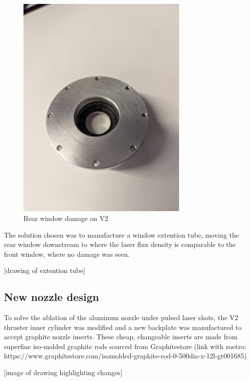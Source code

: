             \begin{figure}
                \centering
                \includegraphics[width=0.75\textwidth]{assets/4 experiments/window damage.jpg}
                \caption{Rear window damage on V2}
            \end{figure}

            The solution chosen was to manufacture a window extention tube, moving the rear window downstream to where the laser flux density is comparable to the front window, where no damage was seen.

            [drawing of extention tube]

        \subsection{New nozzle design}
            
            To solve the ablation of the aluminum nozzle under pulsed laser shots, the V2 thruster inner cylinder was modified and a new backplate was manufactured to accept graphite nozzle inserts. These cheap, changeable inserts are made from superfine iso-molded graphite rods sourced from Graphitestore (link with zoetro: https://www.graphitestore.com/isomolded-graphite-rod-0-500dia-x-12l-gt001685)

            [image of drawing highlighting changes]

